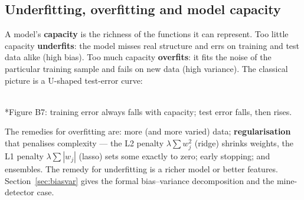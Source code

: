 \documentclass[11pt]{article}
\begin{document}
\subsection{Underfitting, overfitting and model capacity}
A model's \textbf{capacity} is the richness of the functions it can represent. Too little capacity \textbf{underfits}: the model misses real structure and errs on training and test data alike (high bias). Too much capacity \textbf{overfits}: it fits the noise of the particular training sample and fails on new data (high variance). The classical picture is a U-shaped test-error curve:
\begin{center}\\*{\small\color{GreyN}Figure B7: training error always falls with capacity; test error falls, then rises.}\end{center}
The remedies for overfitting are: more (and more varied) data; \textbf{regularisation} that penalises complexity --- the L2 penalty $\lambda\sum w_j^2$ (ridge) shrinks weights, the L1 penalty $\lambda\sum|w_j|$ (lasso) sets some exactly to zero; early stopping; and ensembles. The remedy for underfitting is a richer model or better features. Section~\ref{sec:biasvar} gives the formal bias--variance decomposition and the mine-detector case.
\end{document}
